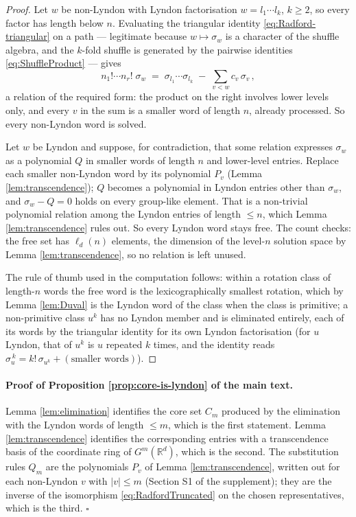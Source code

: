 \documentclass[11pt,english]{article}
\theoremstyle{definition}
\theoremstyle{remark}
\begin{document}
\begin{proof}
Let $w$ be non-Lyndon with Lyndon factorisation $w=l_{1}\cdots l_{k}$,
$k\geq2$, so every factor has length below $n$. Evaluating the
triangular identity \eqref{eq:Radford-triangular} on a path ---
legitimate because $w\mapsto\sigma_{w}$ is a character of the shuffle
algebra, and the $k$-fold shuffle is generated by the pairwise identities
\eqref{eq:ShuffleProduct} --- gives
\[
n_{1}!\cdots n_{r}!\;\sigma_{w}\;=\;\sigma_{l_{1}}\cdots\sigma_{l_{k}}\;-\;\sum_{v<w}c_{v}\,\sigma_{v}\,,
\]
a relation of the required form: the product on the right involves
lower levels only, and every $v$ in the sum is a smaller word of
length $n$, already processed. So every non-Lyndon word is solved.

Let $w$ be Lyndon and suppose, for contradiction, that some relation
expresses $\sigma_{w}$ as a polynomial $Q$ in smaller words of length
$n$ and lower-level entries. Replace each smaller non-Lyndon word by its
polynomial $P_{v}$ (Lemma \ref{lem:transcendence}); $Q$ becomes a
polynomial in Lyndon entries other than $\sigma_{w}$, and
$\sigma_{w}-Q=0$ holds on every group-like element. That is a
non-trivial polynomial relation among the Lyndon entries of length
$\leq n$, which Lemma \ref{lem:transcendence} rules out. So every
Lyndon word stays free. The count checks: the free set has
$\ell_{d}(n)$ elements, the dimension of the level-$n$ solution space
by Lemma \ref{lem:transcendence}, so no relation is left unused.

The rule of thumb used in the computation follows: within a rotation
class of length-$n$ words the free word is the lexicographically
smallest rotation, which by Lemma \ref{lem:Duval} is the Lyndon word of
the class when the class is primitive; a non-primitive class $u^{k}$ has
no Lyndon member and is eliminated entirely, each of its words by the
triangular identity for its own Lyndon factorisation (for $u$ Lyndon,
that of $u^{k}$ is $u$ repeated $k$ times, and the identity reads
$\sigma_{u}^{\,k}=k!\,\sigma_{u^{k}}+(\text{smaller words})$).
\end{proof}

\paragraph{Proof of Proposition \ref{prop:core-is-lyndon} of the main text.}
Lemma \ref{lem:elimination} identifies the core set $C_{m}$ produced by
the elimination with the Lyndon words of length $\leq m$, which is the
first statement. Lemma \ref{lem:transcendence} identifies the
corresponding entries with a transcendence basis of the coordinate ring
of $G^{m}(\mathbb{R}^{d})$, which is the second. The substitution rules
$Q_{m}$ are the polynomials $P_{v}$ of Lemma \ref{lem:transcendence},
written out for each non-Lyndon $v$ with $|v|\leq m$ (Section S1 of the supplement); they are the inverse of the isomorphism
\eqref{eq:RadfordTruncated} on the chosen representatives, which is the
third. \hfill$\square$
\end{document}
